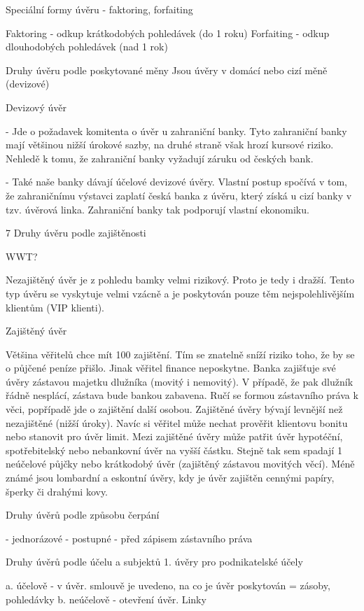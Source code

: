 Speciální formy úvěru - faktoring, forfaiting

Faktoring - odkup krátkodobých pohledávek (do 1 roku)
Forfaiting - odkup dlouhodobých pohledávek (nad 1 rok)

Druhy úvěru podle poskytované měny
Jsou úvěry v domácí nebo cizí měně (devizové)

Devizový úvěr

- Jde o požadavek komitenta o úvěr u zahraniční banky. Tyto zahraniční banky mají většinou
nižší úrokové sazby, na druhé straně však hrozí kursové riziko. Nehledě k tomu, že zahraniční
banky vyžadují záruku od českých bank.

- Také naše banky dávají účelové devizové úvěry. Vlastní postup spočívá v tom, že
zahraničnímu výstavci zaplatí česká banka z úvěru, který získá u cizí banky v tzv. úvěrová
linka. Zahraniční banky tak podporují vlastní ekonomiku.

7
\newpage
Druhy úvěru podle zajištěnosti

WWT?

Nezajištěný úvěr je z pohledu bamky velmi rizikový. Proto je tedy i dražší. Tento typ úvěru
se vyskytuje velmi vzácně a je poskytován pouze těm nejspolehlivějším klientům (VIP
klienti).

Zajištěný úvěr

Většina věřitelů chce mít 100 %
zajištění. Tím se znatelně sníží riziko toho, že by se o půjčené peníze přišlo. Jinak věřitel
finance neposkytne. Banka zajišťuje své úvěry zástavou majetku dlužníka (movitý i
nemovitý). V případě, že pak dlužník řádně nesplácí, zástava bude bankou zabavena. Ručí se
formou zástavního práva k věci, popřípadě jde o zajištění další osobou. Zajištěné úvěry bývají
levnější než nezajištěné (nižší úroky). Navíc si věřitel může nechat prověřit klientovu bonitu
nebo stanovit pro úvěr limit. Mezi zajištěné úvěry může patřit úvěr hypotéční, spotřebitelský
nebo nebankovní úvěr na vyšší částku. Stejně tak sem spadají 1 neúčelové půjčky nebo
krátkodobý úvěr (zajištěný zástavou movitých věcí). Méně známé jsou lombardní a eskontní
úvěry, kdy je úvěr zajištěn cennými papíry, šperky či drahými kovy.

Druhy úvěrů podle způsobu čerpání

- jednorázové
- postupné
- před zápisem zástavního práva

Druhy úvěrů podle účelu a subjektů
1. úvěry pro podnikatelské účely

a. účelově - v úvěr. smlouvě je uvedeno, na co je úvěr poskytován = zásoby, pohledávky
b. neúčelově - otevření úvěr. Linky

